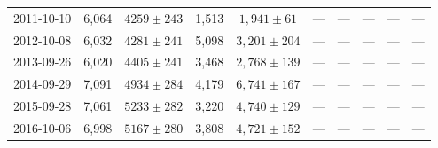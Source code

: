 \begin{landscape}
\begin{longtable}{cccccccccc}
{2011-10-10} & 6,064 & {$4259  \pm  243$} & 1,513 & {$1,941 \pm 61$} & --- & --- & --- & --- & --- \\
{2012-10-08} & 6,032 & {$4281  \pm  241$} & 5,098 & {$3,201 \pm 204$} & --- & --- & --- & --- & --- \\
{2013-09-26} & 6,020 & {$4405  \pm  241$} & 3,468 & {$2,768 \pm 139$} & --- & --- & --- & --- & --- \\
{2014-09-29} & 7,091 & {$4934  \pm  284$} & 4,179 & {$6,741 \pm 167$} & --- & --- & --- & --- & --- \\
{2015-09-28} & 7,061 & {$5233  \pm  282$} & 3,220 & {$4,740 \pm 129$} & --- & --- & --- & --- & --- \\
{2016-10-06} & 6,998 & {$5167  \pm  280$} & 3,808 & {$4,721 \pm 152$} & --- & --- & --- & --- & --- \\
\end{longtable} 
\end{landscape} 
